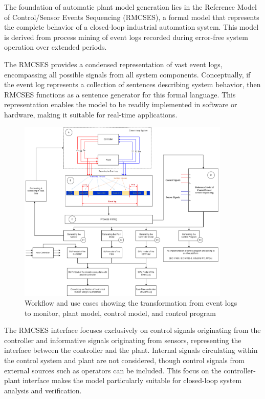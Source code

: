 The foundation of automatic plant model generation lies in the Reference Model of Control/Sensor Events Sequencing (RMCSES), a formal model that represents the complete behavior of a closed-loop industrial automation system. This model is derived from process mining of event logs recorded during error-free system operation over extended periods.

The RMCSES provides a condensed representation of vast event logs, encompassing all possible signals from all system components. Conceptually, if the event log represents a collection of sentences describing system behavior, then RMCSES functions as a sentence generator for this formal language. This representation enables the model to be readily implemented in software or hardware, making it suitable for real-time applications.

\begin{figure}[h]
    \centering
    \includegraphics[width=0.9\textwidth]{MX_Papers/Paper7/images/workflow1.png}
    \caption{Workflow and use cases showing the transformation from event logs to monitor, plant model, control model, and control program}
    \label{fig:workflow_use_cases}
\end{figure}

The RMCSES interface focuses exclusively on control signals originating from the controller and informative signals originating from sensors, representing the interface between the controller and the plant. Internal signals circulating within the control system and plant are not considered, though control signals from external sources such as operators can be included. This focus on the controller-plant interface makes the model particularly suitable for closed-loop system analysis and verification.

